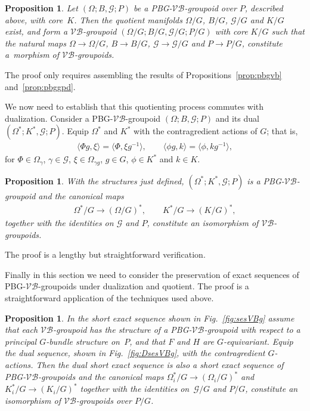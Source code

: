 \documentclass[pdftex]{sigma}
\renewcommand{\to}{\rightarrow}
\newcommand{\gold}{\mscr{G}}
\newcommand{\mscr}[1]{\mathscr{#1}}
\newcommand{\Om}{\Omega}
\numberwithin{equation}{section}
\newtheorem{Proposition}[Theorem]{Proposition}
 { \theoremstyle{definition}
\newtheorem{Definition}[Theorem]{Definition}
\newtheorem{Example}[Theorem]{Example}
\newtheorem{Remark}[Theorem]{Remark} }
\begin{document}
\begin{Proposition}\label{prop:pbgvbgpd}
Let $(\Om;B,\gold;P)$ be a PBG-$\mathcal{V}\!\mathcal{B}$-groupoid over $P$, described above, with co\-re~$K$. Then the quotient manifolds $\Om/G$, $B/G$, $\gold/G$ and $K/G$ exist, and form a $\mathcal{V}\!\mathcal{B}$-groupoid $(\Om/G;B/G,\gold/G;P/G)$ with core $K/G$ such that the natural maps
$\Om\to\Om/G$, $B\to B/G$, $\gold\to\gold/G$ and $P\to P/G$, constitute a~morphism of $\mathcal{V}\!\mathcal{B}$-groupoids.
\end{Proposition}

The proof only requires assembling the results of Propositions~\ref{prop:pbgvb} and~\ref{prop:pbggpd}.

We now need to establish that this quotienting process commutes with dualization. Consider a PBG-$\mathcal{V}\!\mathcal{B}$-groupoid $(\Om;B,\gold;P)$ and its dual $(\Om^*;K^*,\gold;P)$. Equip $\Om^*$ and $K^*$ with the contragredient actions of $G$; that is,
\begin{gather*}
\langle\Phi g,\xi\rangle = \big\langle \Phi,\xi g^{-1}\big\rangle,\qquad \langle\phi g,k\rangle = \big\langle \phi,k g^{-1}\big\rangle,
\end{gather*}
for $\Phi\in \Om_{\gamma}$, $\gamma\in\gold$, $\xi\in\Om_{\gamma g}$, $g\in G$, $\phi\in K^*$ and $k\in K$.

\begin{Proposition} With the structures just defined, $(\Om^*;K^*,\gold;P)$ is a PBG-$\mathcal{V}\!\mathcal{B}$-groupoid and the canonical maps
\begin{gather*}
\Om^*/G\to (\Om/G)^*, \qquad K^*/G\to (K/G)^*,
\end{gather*}
together with the identities on $\gold$ and $P$, constitute an isomorphism of $\mathcal{V}\!\mathcal{B}$-groupoids.
\end{Proposition}

The proof is a lengthy but straightforward verif\/ication.

Finally in this section we need to consider the preservation of exact sequences of PBG-$\mathcal{V}\!\mathcal{B}$-groupoids under dualization and quotient. The proof is a straightforward application of the techniques used above.

\begin{Proposition}\label{prop:sesPBGVBgpds}
In the short exact sequence shown in Fig.~{\rm \ref{fig:sesVBg}} assume that each $\mathcal{V}\!\mathcal{B}$-groupoid has the structure of a PBG-$\mathcal{V}\!\mathcal{B}$-groupoid with respect to a principal $G$-bundle structure on~$P$, and that $F$ and $H$ are $G$-equivariant. Equip the dual sequence, shown in Fig.~{\rm \ref{fig:DsesVBg}}, with the contragredient $G$-actions. Then the dual short exact sequence is also a short exact sequence of PBG-$\mathcal{V}\!\mathcal{B}$-groupoids and the canonical maps $\Om_i^*/G \to (\Om_i/G)^*$ and $K^*_i/G\to(K_i/G)^*$ together with the identities on~$\gold/G$ and $P/G$, constitute an isomorphism of $\mathcal{V}\!\mathcal{B}$-groupoids over $P/G$.
\end{Proposition}
\end{document}
